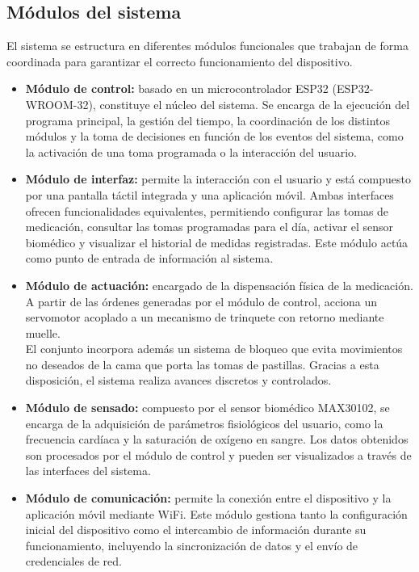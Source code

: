 \subsection{Módulos del sistema}

El sistema se estructura en diferentes módulos funcionales que trabajan de forma coordinada para garantizar el correcto funcionamiento del dispositivo.

\begin{itemize}

    \item \textbf{Módulo de control:} basado en un microcontrolador ESP32 (ESP32-WROOM-32), constituye el núcleo del sistema. Se encarga de la ejecución del programa principal, la gestión del tiempo, la coordinación de los distintos módulos y la toma de decisiones en función de los eventos del sistema, como la activación de una toma programada o la interacción del usuario.

    \item \textbf{Módulo de interfaz:} permite la interacción con el usuario y está compuesto por una pantalla táctil integrada y una aplicación móvil. Ambas interfaces ofrecen funcionalidades equivalentes, permitiendo configurar las tomas de medicación, consultar las tomas programadas para el día, activar el sensor biomédico y visualizar el historial de medidas registradas. Este módulo actúa como punto de entrada de información al sistema.

    \item \textbf{Módulo de actuación:} encargado de la dispensación física de la medicación. A partir de las órdenes generadas por el módulo de control, acciona un servomotor acoplado a un mecanismo de trinquete con retorno mediante muelle.\\

    El conjunto incorpora además un sistema de bloqueo que evita movimientos no deseados de la cama que porta las tomas de pastillas. Gracias a esta disposición, el sistema realiza avances discretos y controlados.

    \item \textbf{Módulo de sensado:} compuesto por el sensor biomédico MAX30102, se encarga de la adquisición de parámetros fisiológicos del usuario, como la frecuencia cardíaca y la saturación de oxígeno en sangre. Los datos obtenidos son procesados por el módulo de control y pueden ser visualizados a través de las interfaces del sistema.

    \item \textbf{Módulo de comunicación:} permite la conexión entre el dispositivo y la aplicación móvil mediante WiFi. Este módulo gestiona tanto la configuración inicial del dispositivo como el intercambio de información durante su funcionamiento, incluyendo la sincronización de datos y el envío de credenciales de red.

\end{itemize}

